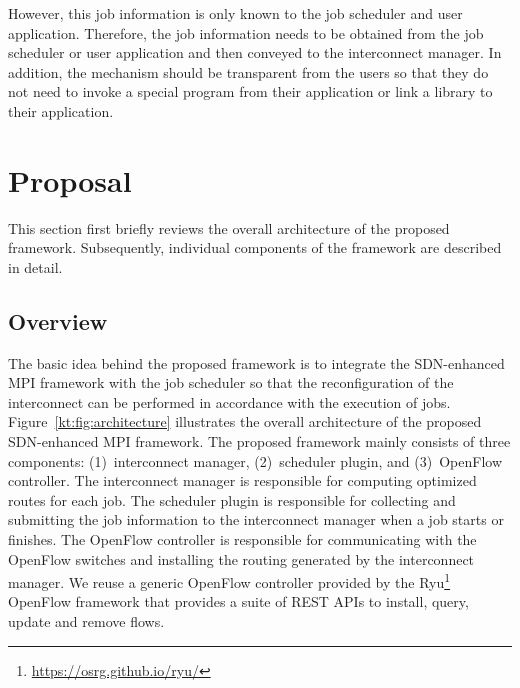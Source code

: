 \documentclass[graybox]{svmult}
\begin{document}
However, this job information is only known to the job scheduler and user
application. Therefore, the job information needs to be obtained from the job
scheduler or user application and then conveyed to the interconnect manager.
In addition, the mechanism should be transparent from the users so that they
do not need to invoke a special program from their application or link a
library to their application.

\section{Proposal}\label{kt:sec:iii}

This section first briefly reviews the overall architecture of the proposed
framework. Subsequently, individual components of the framework are described
in detail.

\subsection{Overview}

The basic idea behind the proposed framework is to integrate the SDN-enhanced
MPI framework with the job scheduler so that the reconfiguration of the
interconnect can be performed in accordance with the execution of jobs.
Figure~\ref{kt:fig:architecture} illustrates the overall architecture of the
proposed SDN-enhanced MPI framework. The proposed framework mainly consists of
three components: (1)~interconnect manager, (2)~scheduler plugin, and
(3)~OpenFlow controller. The interconnect manager is responsible for computing
optimized routes  for each job. The scheduler plugin is responsible for
collecting and submitting the job information to the interconnect manager when
a job starts or finishes. The OpenFlow controller is responsible for
communicating with the OpenFlow switches and installing the routing generated
by the interconnect manager. We reuse a generic OpenFlow controller provided
by the Ryu\footnote{\url{https://osrg.github.io/ryu/}} OpenFlow framework that
provides a suite of REST APIs to install, query, update and remove flows.
\end{document}
